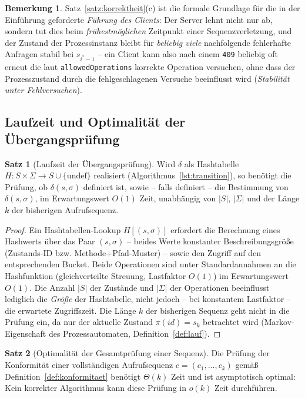 ﻿\documentclass[a4paper,12pt]{article}
\theoremstyle{definition}
\newtheorem{satz}{Satz}
\newtheorem{bemerkung}{Bemerkung}
\begin{document}
\begin{bemerkung}
	Satz~\ref{satz:korrektheit}(c) ist die formale Grundlage für die in der Einführung
	geforderte \emph{Führung des Clients}: Der Server lehnt nicht nur ab, sondern tut dies
	beim \emph{frühestmöglichen} Zeitpunkt einer Sequenzverletzung, und der Zustand der
	Prozessinstanz bleibt für \emph{beliebig viele} nachfolgende fehlerhafte Anfragen
	stabil bei $s_{i^\ast-1}$ -- ein Client kann also nach einem \texttt{409} beliebig oft
	erneut die laut \texttt{allowedOperations} korrekte Operation versuchen, ohne dass
	der Prozesszustand durch die fehlgeschlagenen Versuche beeinflusst wird
	(\emph{Stabilität unter Fehlversuchen}).
\end{bemerkung}

\subsection{Laufzeit und Optimalität der Übergangsprüfung}

\begin{satz}[Laufzeit der Übergangsprüfung]
	\label{satz:laufzeit-pruefung}
	Wird $\delta$ als Hashtabelle $H: S \times \Sigma \to S \cup \{\text{undef}\}$
	realisiert (Algorithmus~\ref{lst:transition}), so benötigt die Prüfung, ob
	$\delta(s,\sigma)$ definiert ist, sowie -- falls definiert -- die Bestimmung von
	$\delta(s,\sigma)$, im Erwartungswert $O(1)$ Zeit, unabhängig von $|S|$, $|\Sigma|$
	und der Länge $k$ der bisherigen Aufrufsequenz.
\end{satz}

\begin{proof}
	Ein Hashtabellen-Lookup $H[(s,\sigma)]$ erfordert die Berechnung eines Hashwerts über
	das Paar $(s,\sigma)$ -- beides Werte konstanter Beschreibungsgröße (Zustands-ID bzw.
	Methode+Pfad-Muster) -- sowie den Zugriff auf den entsprechenden Bucket. Beide
	Operationen sind unter Standardannahmen an die Hashfunktion (gleichverteilte Streuung,
	Lastfaktor $O(1)$) im Erwartungswert $O(1)$. Die Anzahl $|S|$ der Zustände und
	$|\Sigma|$ der Operationen beeinflusst lediglich die \emph{Größe} der Hashtabelle,
	nicht jedoch -- bei konstantem Lastfaktor -- die erwartete Zugriffszeit. Die Länge $k$
	der bisherigen Sequenz geht nicht in die Prüfung ein, da nur der aktuelle Zustand
	$\pi(id)=s_{k}$ betrachtet wird (Markov-Eigenschaft des Prozessautomaten,
	Definition~\ref{def:lauf}). \qedhere
\end{proof}

\begin{satz}[Optimalität der Gesamtprüfung einer Sequenz]
	\label{satz:optimalitaet-sequenz}
	Die Prüfung der Konformität einer vollständigen Aufrufsequenz $c=(c_1,\ldots,c_k)$
	gemäß Definition~\ref{def:konformitaet} benötigt $\Theta(k)$ Zeit und ist
	asymptotisch optimal: Kein korrekter Algorithmus kann diese Prüfung in $o(k)$ Zeit
	durchführen.
\end{satz}
\end{document}
